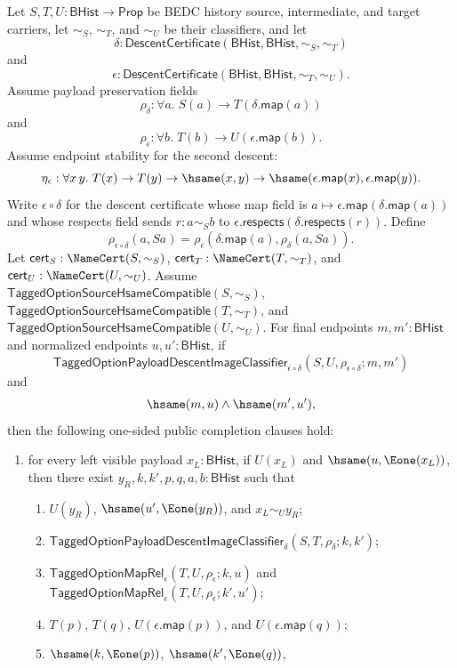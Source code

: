\begin{theorem}
Let $S,T,U:\mathsf{BHist}\to\mathsf{Prop}$ be BEDC history source,
intermediate, and target carriers, let $\sim_S$, $\sim_T$, and $\sim_U$ be their
classifiers, and let
$$
\delta:\mathsf{DescentCertificate}(\mathsf{BHist},\mathsf{BHist},\sim_S,\sim_T)
$$
and
$$
\epsilon:\mathsf{DescentCertificate}(\mathsf{BHist},\mathsf{BHist},\sim_T,\sim_U).
$$
Assume payload preservation fields
$$
\rho_{\delta}:\forall a.\;S(a)\to T(\delta.\mathsf{map}(a))
$$
and
$$
\rho_{\epsilon}:\forall b.\;T(b)\to U(\epsilon.\mathsf{map}(b)).
$$
Assume endpoint stability for the second descent:
$$
\eta_{\epsilon}:\forall x\,y.\;
T(x)\to T(y)\to \hsame(x,y)\to
\hsame(\epsilon.\mathsf{map}(x),\epsilon.\mathsf{map}(y)).
$$
Write $\epsilon\circ\delta$ for the descent certificate whose map field is
$a\mapsto\epsilon.\mathsf{map}(\delta.\mathsf{map}(a))$ and whose respects field
sends $r:a\sim_S b$ to
$\epsilon.\mathsf{respects}(\delta.\mathsf{respects}(r))$. Define
$$
\rho_{\epsilon\circ\delta}(a,Sa)=
\rho_{\epsilon}(\delta.\mathsf{map}(a),\rho_{\delta}(a,Sa)).
$$
Let $\mathsf{cert}_S:\NameCert(S,\sim_S)$,
$\mathsf{cert}_T:\NameCert(T,\sim_T)$, and
$\mathsf{cert}_U:\NameCert(U,\sim_U)$. Assume
$\mathsf{TaggedOptionSourceHsameCompatible}(S,\sim_S)$,
$\mathsf{TaggedOptionSourceHsameCompatible}(T,\sim_T)$, and
$\mathsf{TaggedOptionSourceHsameCompatible}(U,\sim_U)$. For final endpoints
$m,m':\mathsf{BHist}$ and normalized endpoints $u,u':\mathsf{BHist}$, if
$$
\mathsf{TaggedOptionPayloadDescentImageClassifier}_{\epsilon\circ\delta}
(S,U,\rho_{\epsilon\circ\delta};m,m')
$$
and
$$
\hsame(m,u)\land \hsame(m',u'),
$$
then the following one-sided public completion clauses hold:
\begin{enumerate}
\item for every left visible payload $x_L:\mathsf{BHist}$, if $U(x_L)$ and
$\hsame(u,\Eone(x_L))$, then there exist $y_R,k,k',p,q,a,b:\mathsf{BHist}$ such
that
\begin{enumerate}
\item $U(y_R)$, $\hsame(u',\Eone(y_R))$, and $x_L\sim_U y_R$;
\item $\mathsf{TaggedOptionPayloadDescentImageClassifier}_{\delta}
(S,T,\rho_{\delta};k,k')$;
\item $\mathsf{TaggedOptionMapRel}_{\epsilon}(T,U,\rho_{\epsilon};k,u)$ and
$\mathsf{TaggedOptionMapRel}_{\epsilon}(T,U,\rho_{\epsilon};k',u')$;
\item $T(p)$, $T(q)$, $U(\epsilon.\mathsf{map}(p))$, and
$U(\epsilon.\mathsf{map}(q))$;
\item $\hsame(k,\Eone(p))$, $\hsame(k',\Eone(q))$,

\end{enumerate}
\end{enumerate}
\end{theorem}
